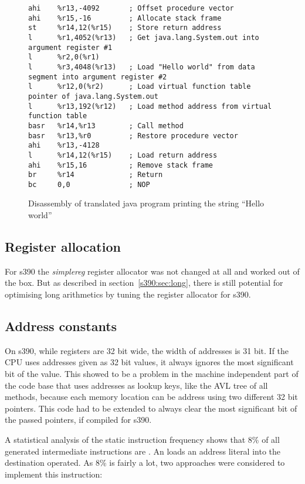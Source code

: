 \begin{figure}
\begin{verbatim}
ahi    %r13,-4092       ; Offset procedure vector
ahi    %r15,-16         ; Allocate stack frame
st     %r14,12(%r15)    ; Store return address
l      %r1,4052(%r13)   ; Get java.lang.System.out into argument register #1
l      %r2,0(%r1)
l      %r3,4048(%r13)   ; Load "Hello world" from data segment into argument register #2
l      %r12,0(%r2)      ; Load virtual function table pointer of java.lang.System.out
l      %r13,192(%r12)   ; Load method address from virtual function table
basr   %r14,%r13        ; Call method
basr   %r13,%r0         ; Restore procedure vector
ahi    %r13,-4128
l      %r14,12(%r15)    ; Load return address
ahi    %r15,16          ; Remove stack frame
br     %r14             ; Return
bc     0,0              ; NOP
\end{verbatim}
\caption{Disassembly of translated java program printing the string ``Hello world''}
\label{s390:fig:jit:hellojdis}
\end{figure}

\subsection{Register allocation}

For s390 the \emph{simplereg} register allocator was not changed at all and worked out of the box. But as described in section~\ref{s390:sec:long}, there is still potential for optimising long arithmetics by tuning the register allocator for s390.

\subsection{Address constants}

On s390, while registers are 32 bit wide, the width of addresses is 31 bit. If the CPU uses addresses given as 32 bit values, it always ignores the most significant bit of the value. This showed to be a problem in the machine independent part of the code base that uses addresses as lookup keys, like the AVL tree of all methods, because each memory location can be address using two different 32 bit pointers. This code had to be extended to always clear the most significant bit of the passed pointers, if compiled for s390.

A statistical analysis of the static instruction frequency shows that 8\% of all generated intermediate instructions are . An  loads an address literal into the destination operated. As 8\% is fairly a lot, two approaches were considered to implement this instruction:
 
